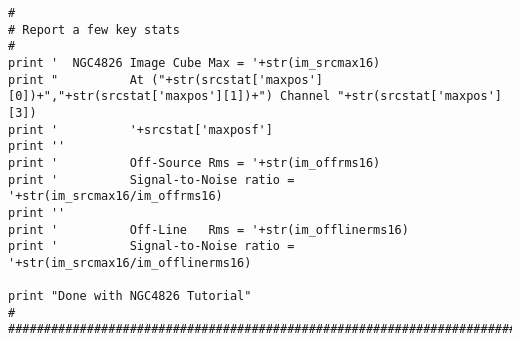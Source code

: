 \begin{verbatim}
#
# Report a few key stats
#
print '  NGC4826 Image Cube Max = '+str(im_srcmax16)
print "          At ("+str(srcstat['maxpos'][0])+","+str(srcstat['maxpos'][1])+") Channel "+str(srcstat['maxpos'][3])
print '          '+srcstat['maxposf']
print ''
print '          Off-Source Rms = '+str(im_offrms16)
print '          Signal-to-Noise ratio = '+str(im_srcmax16/im_offrms16)
print ''
print '          Off-Line   Rms = '+str(im_offlinerms16)
print '          Signal-to-Noise ratio = '+str(im_srcmax16/im_offlinerms16)

print "Done with NGC4826 Tutorial"
#
##########################################################################

\end{verbatim}
\normalsize


